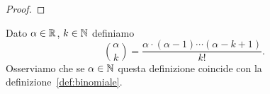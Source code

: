 \begin{proof}

\end{proof}

\begin{definition}
\label{def:binomiale_reale}
\mymark{***}
Dato $\alpha \in \mathbb R$, $k \in \mathbb N$ definiamo
\[
 {\alpha \choose k } = \frac{\alpha \cdot (\alpha-1) \cdots (\alpha -k +1)}{k!}.
\]
Osserviamo che se $\alpha \in \mathbb N$ questa definizione coincide
con la definizione~\ref{def:binomiale}.
\end{definition}

